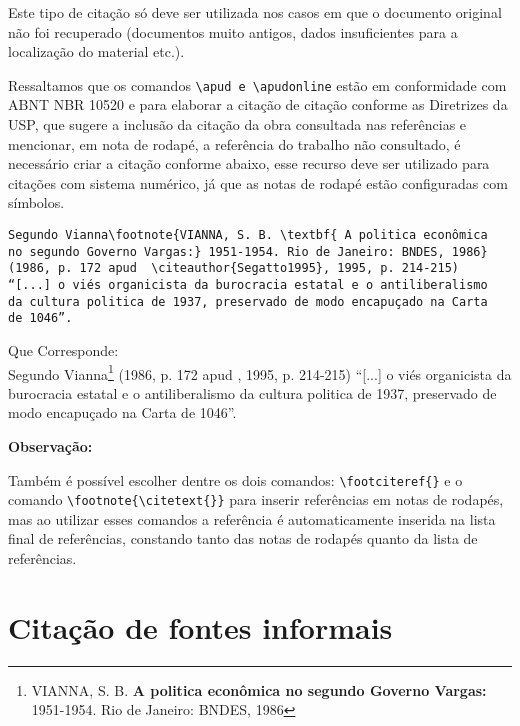 Este tipo de citação só deve ser utilizada nos casos em que o documento original não foi recuperado (documentos muito antigos, dados insuficientes para a localização do material etc.).

Ressaltamos que os comandos \verb+\apud e \apudonline+ estão em conformidade com ABNT NBR 10520 e para elaborar a citação de citação conforme as Diretrizes da USP, que sugere a inclusão da citação da obra consultada nas referências e mencionar, em nota de rodapé, a referência do trabalho não consultado, é necessário criar a citação conforme abaixo, esse recurso deve ser utilizado para citações com sistema numérico, já que as notas de rodapé estão configuradas com símbolos. 



\begin{alineas}
\item 
\begin{verbatim}
Segundo Vianna\footnote{VIANNA, S. B. \textbf{ A politica econômica 
no segundo Governo Vargas:} 1951-1954. Rio de Janeiro: BNDES, 1986}
(1986, p. 172 apud  \citeauthor{Segatto1995}, 1995, p. 214-215) 
“[...] o viés organicista da burocracia estatal e o antiliberalismo 
da cultura politica de 1937, preservado de modo encapuçado na Carta 
de 1046”.
\end{verbatim}
\end{alineas}


Que Corresponde: \\

Segundo Vianna\footnote{VIANNA, S. B.\textbf{ A politica econômica no segundo Governo Vargas:} 1951-1954. Rio de Janeiro: BNDES, 1986} (1986, p. 172 apud \citeauthor{Segatto1995}, 1995, p. 214-215) “[...] o viés organicista da burocracia estatal e o antiliberalismo da cultura politica de 1937, preservado de modo encapuçado na Carta de 1046”.

\newpage

\textbf{Observação:}

Também é possível escolher dentre os dois comandos: \verb+\footciteref{}+ e o comando \verb+\footnote{\citetext{}}+ para inserir referências em notas de rodapés, mas ao utilizar esses comandos a referência é automaticamente inserida na lista final de referências, constando tanto das notas de rodapés quanto da lista de referências.

\section{Citação de fontes informais}

